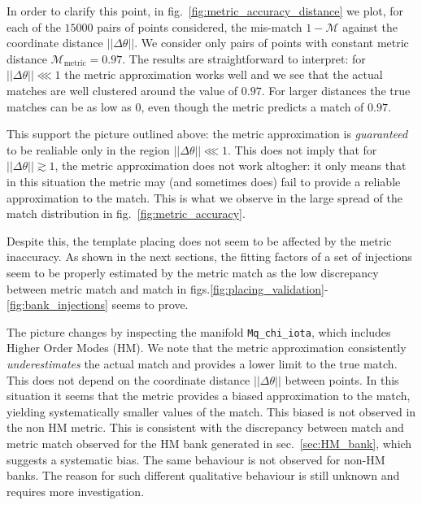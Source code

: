 \documentclass[twocolumn,showpacs,preprintnumbers,nofootinbib,prd,
superscriptaddress,10pt]{revtex4-2}
\begin{document}
In order to clarify this point, in fig.~\ref{fig:metric_accuracy_distance} we plot, for each of the $15000$ pairs of points considered, the mis-match $1-\mathcal{M}$ against the coordinate distance $||\Delta\theta||$. We consider only pairs of points with constant metric distance $\mathcal{M}_{\text{metric}} = 0.97$. The results are straightforward to interpret: for $||\Delta\theta|| \lll 1$ the metric approximation works well and we see that the actual matches are well clustered around the value of $0.97$. For larger distances the true matches can be as low as $0$, even though the metric predicts a match of $0.97$.

This support the picture outlined above: the metric approximation is {\it guaranteed} to be realiable only in the region $||\Delta\theta|| \lll 1$. This does not imply that for $||\Delta\theta|| \gtrsim 1$, the metric approximation does not work altogher: it only means that in this situation the metric may (and sometimes does) fail to provide a reliable approximation to the match. This is what we observe in the large spread of the match distribution in fig.~\ref{fig:metric_accuracy}.

Despite this, the template placing does not seem to be affected by the metric inaccuracy. As shown in the next sections, the fitting factors of a set of injections seem to be properly estimated by the metric match as the low discrepancy between metric match and match in figs.\ref{fig:placing_validation}-\ref{fig:bank_injections} seems to prove.

The picture changes by inspecting the manifold \texttt{Mq\_chi\_iota}, which includes Higher Order Modes (HM).
We note that the metric approximation consistently {\it underestimates} the actual match and provides a lower limit to the true match. This does not depend on the coordinate distance $||\Delta\theta||$ between points.
In this situation it seems that the metric provides a biased approximation to the match, yielding systematically smaller values of the match. This biased is not observed in the non HM metric. This is consistent with the discrepancy between match and metric match observed for the HM bank generated in sec.~\ref{sec:HM_bank}, which suggests a systematic bias. The same behaviour is not observed for non-HM banks.
The reason for such different qualitative behaviour is still unknown and requires more investigation. 

\end{document}
